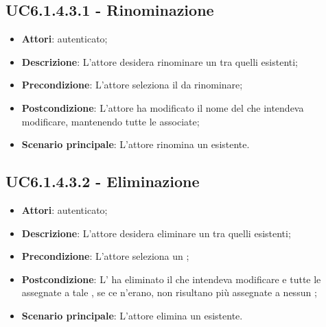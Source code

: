 \subsection{UC6.1.4.3.1 - Rinominazione }
\label{ssec:UC6.1.4.3.1}
\begin{itemize}
\item \textbf{Attori}:  autenticato;
\item \textbf{Descrizione}: L'attore desidera rinominare un  tra quelli esistenti;
\item \textbf{Precondizione}: L'attore seleziona il  da rinominare;
\item \textbf{Postcondizione}: L'attore ha modificato il nome del  che intendeva modificare, mantenendo tutte le  associate;
\item \textbf{Scenario principale}: L'attore rinomina un  esistente.
\end{itemize}
\subsection{UC6.1.4.3.2 - Eliminazione }
\label{ssec:UC6.1.4.3.2}
\begin{itemize}
\item \textbf{Attori}:  autenticato;
\item \textbf{Descrizione}: L'attore desidera eliminare un  tra quelli esistenti;
\item \textbf{Precondizione}: L'attore seleziona un ;
\item \textbf{Postcondizione}: L' ha eliminato il  che intendeva modificare e tutte le  assegnate a tale , se ce n'erano, non risultano più assegnate a nessun ;
\item \textbf{Scenario principale}: L'attore elimina un  esistente.
\end{itemize}
\newpage
